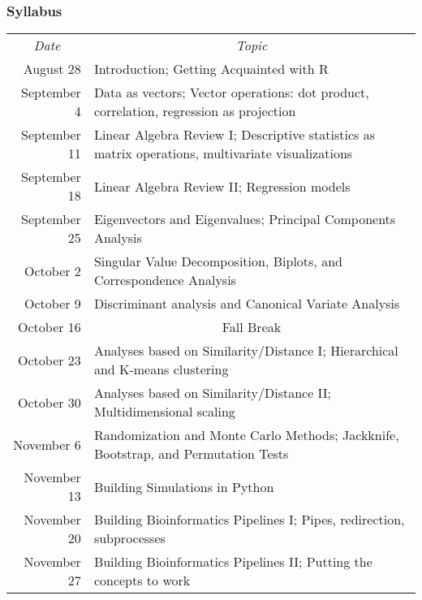 \documentclass{beamer}
\begin{document}
\begin{frame}
  \frametitle{Syllabus}

\scriptsize

\renewcommand{\arraystretch}{1.1}
\begin{tabular}{rp{3.5in}}
\multicolumn{1}{c}{{\sl Date}} & \multicolumn{1}{c}{{\sl Topic}} \\
August 28 & Introduction; Getting Acquainted with R \\
September 4 & Data as vectors; Vector operations: dot product, correlation, regression as projection \\
September 11 & Linear Algebra Review I; Descriptive statistics as matrix operations, multivariate visualizations \\
September 18 & Linear Algebra Review II; Regression models \\
September 25 & Eigenvectors and Eigenvalues; Principal Components Analysis \\
October 2 & Singular Value Decomposition, Biplots, and Correspondence Analysis\\
October 9 & Discriminant analysis and Canonical Variate Analysis\\
October 16 & \multicolumn{1}{c}{{\sc \alert{Fall Break}}} \\
October 23 & Analyses based on Similarity/Distance I; Hierarchical and K-means clustering\\
October 30 & Analyses based on Similarity/Distance II; Multidimensional scaling\\
November 6 & Randomization and Monte Carlo Methods; Jackknife, Bootstrap, and Permutation Tests\\
November 13 & Building Simulations in Python\\ 
November 20 & Building Bioinformatics Pipelines I; Pipes, redirection, subprocesses \\
November 27 & Building Bioinformatics Pipelines II; Putting the concepts to work \\ 


\end{tabular}

\normalsize

\end{frame}
\end{document}
